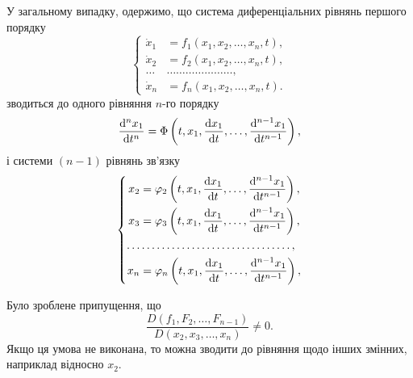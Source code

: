 У загальному випадку, одержимо, що система диференціальних рівнянь першого порядку
\begin{equation*}
	\left\{
		\begin{aligned}
			\dot x_1 &= f_1 (x_1, x_2, \ldots, x_n, t), \\
			\dot x_2 &= f_2 (x_1, x_2, \ldots, x_n, t), \\
			\ldots & \ldots \ldots \ldots \ldots \ldots \ldots \ldots, \\
			\dot x_n &= f_n (x_1, x_2, \ldots, x_n, t).
		\end{aligned}
	\right.
\end{equation*}
зводиться до одного рівняння $n$-го порядку
\begin{equation*}
	\frac{\mathop{}\!\mathrm{d}^n x_1}{\mathop{}\!\mathrm{d} t^n} = \Phi \left( t, x_1, \frac{\mathop{}\!\mathrm{d} x_1}{\mathop{}\!\mathrm{d} t}, \ldots, \frac{\mathop{}\!\mathrm{d}^{n - 1} x_1}{\mathop{}\!\mathrm{d} t^{n - 1}} \right),
\end{equation*}
і системи $(n - 1)$ рівнянь зв'язку
\begin{equation*}
	\left\{
		\begin{aligned}
			x_2 &= \phi_2 \left( t, x_1, \frac{\diff x_1}{\diff t}, \ldots, \frac{\diff^{n - 1} x_1}{\diff t^{n - 1}} \right), \\
			x_3 &= \phi_3 \left( t, x_1, \frac{\diff x_1}{\diff t}, \ldots, \frac{\diff^{n - 1} x_1}{\diff t^{n - 1}} \right), \\
			\ldots & \ldots \ldots \ldots \ldots \ldots \ldots \ldots \ldots \ldots \ldots, \\
			x_n &= \phi_n \left( t, x_1, \frac{\diff x_1}{\diff t}, \ldots, \frac{\diff^{n - 1} x_1}{\diff t^{n - 1}} \right), \\
		\end{aligned}
	\right.
\end{equation*}
 
\begin{remark}
	Було зроблене припущення, що \[\frac{D(f_1, F_2, \ldots, F_{n - 1})}{D(x_2, x_3, \ldots, x_n)} \ne 0.\] Якщо ця умова не виконана, то можна зводити до рівняння щодо інших змінних, наприклад відносно $x_2$.
\end{remark}
